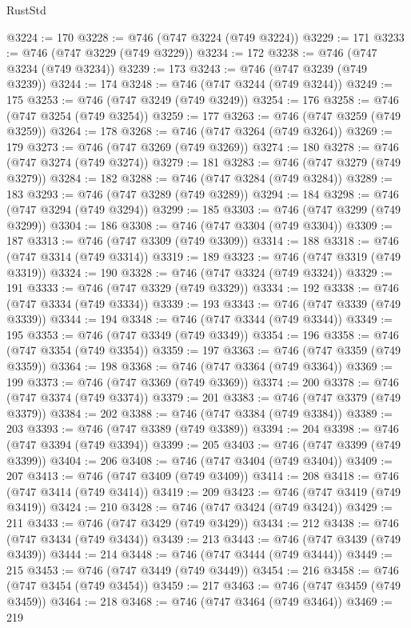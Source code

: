 \begin{lexlean}{RustStd}
\begin{coremodule}
{\begin{coremodule}
{{{{{{{{{{{{{{{{{{{{{{{{{{{{{{{{{{{{{{{{{{{{{{{{{{{{{{{{{{{{{{{{{{{{{{{{{{{{{{{{@3224 := 170
@3228 := @746 (@747 @3224 (@749 @3224))
@3229 := 171
@3233 := @746 (@747 @3229 (@749 @3229))
@3234 := 172
@3238 := @746 (@747 @3234 (@749 @3234))
@3239 := 173
@3243 := @746 (@747 @3239 (@749 @3239))
@3244 := 174
@3248 := @746 (@747 @3244 (@749 @3244))
@3249 := 175
@3253 := @746 (@747 @3249 (@749 @3249))
@3254 := 176
@3258 := @746 (@747 @3254 (@749 @3254))
@3259 := 177
@3263 := @746 (@747 @3259 (@749 @3259))
@3264 := 178
@3268 := @746 (@747 @3264 (@749 @3264))
@3269 := 179
@3273 := @746 (@747 @3269 (@749 @3269))
@3274 := 180
@3278 := @746 (@747 @3274 (@749 @3274))
@3279 := 181
@3283 := @746 (@747 @3279 (@749 @3279))
@3284 := 182
@3288 := @746 (@747 @3284 (@749 @3284))
@3289 := 183
@3293 := @746 (@747 @3289 (@749 @3289))
@3294 := 184
@3298 := @746 (@747 @3294 (@749 @3294))
@3299 := 185
@3303 := @746 (@747 @3299 (@749 @3299))
@3304 := 186
@3308 := @746 (@747 @3304 (@749 @3304))
@3309 := 187
@3313 := @746 (@747 @3309 (@749 @3309))
@3314 := 188
@3318 := @746 (@747 @3314 (@749 @3314))
@3319 := 189
@3323 := @746 (@747 @3319 (@749 @3319))
@3324 := 190
@3328 := @746 (@747 @3324 (@749 @3324))
@3329 := 191
@3333 := @746 (@747 @3329 (@749 @3329))
@3334 := 192
@3338 := @746 (@747 @3334 (@749 @3334))
@3339 := 193
@3343 := @746 (@747 @3339 (@749 @3339))
@3344 := 194
@3348 := @746 (@747 @3344 (@749 @3344))
@3349 := 195
@3353 := @746 (@747 @3349 (@749 @3349))
@3354 := 196
@3358 := @746 (@747 @3354 (@749 @3354))
@3359 := 197
@3363 := @746 (@747 @3359 (@749 @3359))
@3364 := 198
@3368 := @746 (@747 @3364 (@749 @3364))
@3369 := 199
@3373 := @746 (@747 @3369 (@749 @3369))
@3374 := 200
@3378 := @746 (@747 @3374 (@749 @3374))
@3379 := 201
@3383 := @746 (@747 @3379 (@749 @3379))
@3384 := 202
@3388 := @746 (@747 @3384 (@749 @3384))
@3389 := 203
@3393 := @746 (@747 @3389 (@749 @3389))
@3394 := 204
@3398 := @746 (@747 @3394 (@749 @3394))
@3399 := 205
@3403 := @746 (@747 @3399 (@749 @3399))
@3404 := 206
@3408 := @746 (@747 @3404 (@749 @3404))
@3409 := 207
@3413 := @746 (@747 @3409 (@749 @3409))
@3414 := 208
@3418 := @746 (@747 @3414 (@749 @3414))
@3419 := 209
@3423 := @746 (@747 @3419 (@749 @3419))
@3424 := 210
@3428 := @746 (@747 @3424 (@749 @3424))
@3429 := 211
@3433 := @746 (@747 @3429 (@749 @3429))
@3434 := 212
@3438 := @746 (@747 @3434 (@749 @3434))
@3439 := 213
@3443 := @746 (@747 @3439 (@749 @3439))
@3444 := 214
@3448 := @746 (@747 @3444 (@749 @3444))
@3449 := 215
@3453 := @746 (@747 @3449 (@749 @3449))
@3454 := 216
@3458 := @746 (@747 @3454 (@749 @3454))
@3459 := 217
@3463 := @746 (@747 @3459 (@749 @3459))
@3464 := 218
@3468 := @746 (@747 @3464 (@749 @3464))
@3469 := 219
}}}}}}}}}}}}}}}}}}}}}}}}}}}}}}}}}}}}}}}}}}}}}}}}}}}}}}}}}}}}}}}}}}}}}}}}}}}}}}}}
\end{coremodule}}
\end{coremodule}
\end{lexlean}
